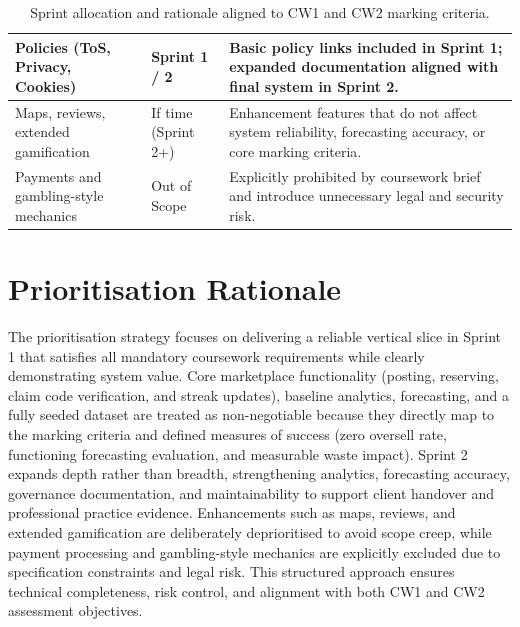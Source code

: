 \documentclass[12pt]{article}
\begin{document}
\begin{table}[H]
\begin{tabular}{|p{4cm}|p{2cm}|p{8cm}|}
Policies (ToS, Privacy, Cookies) &
Sprint 1 / 2 &
Basic policy links included in Sprint 1; expanded documentation aligned with final system in Sprint 2. \\
\hline

Maps, reviews, extended gamification &
If time (Sprint 2+) &
Enhancement features that do not affect system reliability, forecasting accuracy, or core marking criteria. \\
\hline

Payments and gambling-style mechanics &
Out of Scope &
Explicitly prohibited by coursework brief and introduce unnecessary legal and security risk. \\
\hline
\end{tabular}
\caption{Sprint allocation and rationale aligned to CW1 and CW2 marking criteria.}
\end{table}

\FloatBarrier

\vspace{8mm}

\section{Prioritisation Rationale}

The prioritisation strategy focuses on delivering a reliable vertical slice in Sprint 1 that satisfies all mandatory coursework requirements while clearly demonstrating system value. Core marketplace functionality (posting, reserving, claim code verification, and streak updates), baseline analytics, forecasting, and a fully seeded dataset are treated as non-negotiable because they directly map to the marking criteria and defined measures of success (zero oversell rate, functioning forecasting evaluation, and measurable waste impact). Sprint 2 expands depth rather than breadth, strengthening analytics, forecasting accuracy, governance documentation, and maintainability to support client handover and professional practice evidence. Enhancements such as maps, reviews, and extended gamification are deliberately deprioritised to avoid scope creep, while payment processing and gambling-style mechanics are explicitly excluded due to specification constraints and legal risk. This structured approach ensures technical completeness, risk control, and alignment with both CW1 and CW2 assessment objectives.
\end{document}
